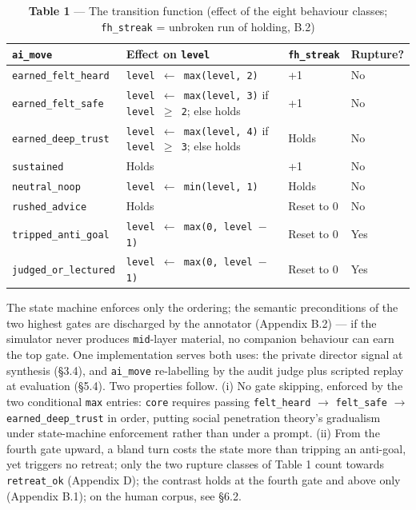 \documentclass[letterpaper]{article}
\begin{document}
\begin{table}[t]
\centering\scriptsize
\setlength{\tabcolsep}{4pt}
\caption{\textbf{Table 1} --- The transition function (effect of the eight behaviour classes; \texttt{fh\_streak} = unbroken run of holding, B.2)}
\begin{tabular}{@{}>{\raggedright\arraybackslash}p{}>{\raggedright\arraybackslash}p{}>{\raggedright\arraybackslash}p{}>{\raggedright\arraybackslash}p{}@{}}
\toprule
\texttt{ai\_move} & Effect on \texttt{level} & \texttt{fh\_streak} & Rupture? \\
\midrule
\texttt{earned\_felt\_heard} & \texttt{level $\leftarrow$ max(level, 2)} & +1 & No \\
\texttt{earned\_felt\_safe} & \texttt{level $\leftarrow$ max(level, 3)} if \texttt{level $\geq$ 2}; else holds & +1 & No \\
\texttt{earned\_deep\_trust} & \texttt{level $\leftarrow$ max(level, 4)} if \texttt{level $\geq$ 3}; else holds & Holds & No \\
\texttt{sustained} & Holds & +1 & No \\
\texttt{neutral\_noop} & \texttt{level $\leftarrow$ min(level, 1)} & Holds & No \\
\texttt{rushed\_advice} & Holds & Reset to 0 & No \\
\texttt{tripped\_anti\_goal} & \texttt{level $\leftarrow$ max(0, level $-$ 1)} & Reset to 0 & Yes \\
\texttt{judged\_or\_lectured} & \texttt{level $\leftarrow$ max(0, level $-$ 1)} & Reset to 0 & Yes \\
\bottomrule
\end{tabular}
\end{table}

The state machine enforces only the ordering; the semantic preconditions of the two highest gates are discharged by the annotator (Appendix B.2) --- if the simulator never produces \texttt{mid}-layer material, no companion behaviour can earn the top gate. One implementation serves both uses: the private director signal at synthesis (\S{}3.4), and \texttt{ai\_move} re-labelling by the audit judge plus scripted replay at evaluation (\S{}5.4). Two properties follow. (i) No gate skipping, enforced by the two conditional \texttt{max} entries: \texttt{core} requires passing \texttt{felt\_heard} $\rightarrow$ \texttt{felt\_safe} $\rightarrow$ \texttt{earned\_deep\_trust} in order, putting social penetration theory's gradualism under state-machine enforcement rather than under a prompt. (ii) From the fourth gate upward, a bland turn costs the state more than tripping an anti-goal, yet triggers no retreat; only the two rupture classes of Table 1 count towards \texttt{retreat\_ok} (Appendix D); the contrast holds at the fourth gate and above only (Appendix B.1); on the human corpus, see \S{}6.2.
\end{document}

